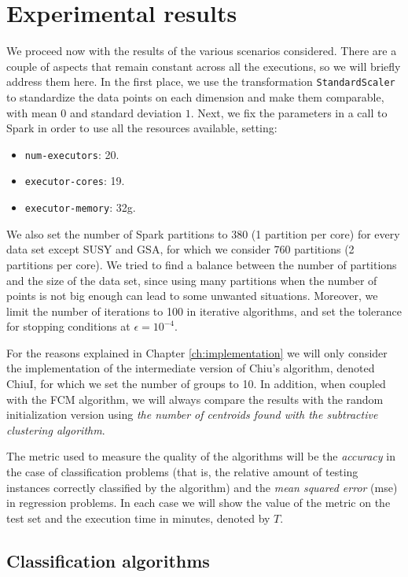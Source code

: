 \section{Experimental results}

We proceed now with the results of the various scenarios considered. There are a couple of aspects that remain constant across all the executions, so we will briefly address them here. In the first place, we use the transformation \verb|StandardScaler| to standardize the data points on each dimension and make them comparable, with mean $0$ and standard deviation $1$. Next, we fix the parameters in a call to Spark in order to use all the resources available, setting:

\begin{itemize}
  \item \verb|num-executors|: 20.
  \item \verb|executor-cores|: 19.
  \item \verb|executor-memory|: 32g.
\end{itemize}
We also set the number of Spark partitions to 380 (1 partition per core) for every data set except SUSY and GSA, for which we consider 760 partitions (2 partitions per core). We tried to find a balance between the number of partitions and the size of the data set, since using many partitions when the number of points is not big enough can lead to some unwanted situations. Moreover, we limit the number of iterations to 100 in iterative algorithms, and set the tolerance for stopping conditions at $\epsilon=10^{-4}$.

For the reasons explained in Chapter \ref{ch:implementation} we will only consider the implementation of the intermediate version of Chiu's algorithm, denoted ChiuI, for which we set the number of groups to 10. In addition, when coupled with the FCM algorithm, we will always compare the results with the random initialization version using \textit{the number of centroids found with the subtractive clustering algorithm}.

The metric used to measure the quality of the algorithms will be the \textit{accuracy} in the case of classification problems (that is, the relative amount of testing instances correctly classified by the algorithm) and the \textit{mean squared error} (\acrshort{mse}) in regression problems. In each case we will show the value of the metric on the test set and the execution time in minutes, denoted by $T$.

\subsection{Classification algorithms}

